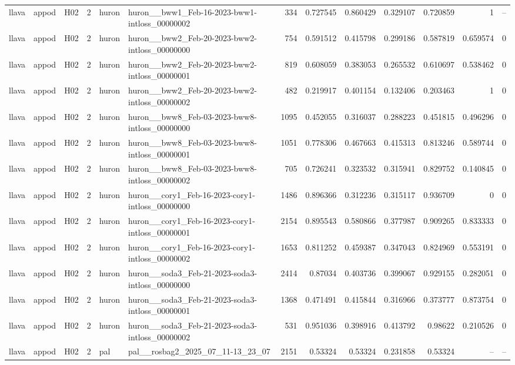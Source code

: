 \begin{longtable}{lllrllrrrrrrr}
llava & appod & H02 & 2 & huron & huron\_\_bww1\_Feb-16-2023-bww1-intloss\_00000002 & 334 & 0.727545 & 0.860429 & 0.329107 & 0.720859 & 1 & -- \\
llava & appod & H02 & 2 & huron & huron\_\_bww2\_Feb-20-2023-bww2-intloss\_00000000 & 754 & 0.591512 & 0.415798 & 0.299186 & 0.587819 & 0.659574 & 0 \\
llava & appod & H02 & 2 & huron & huron\_\_bww2\_Feb-20-2023-bww2-intloss\_00000001 & 819 & 0.608059 & 0.383053 & 0.265532 & 0.610697 & 0.538462 & 0 \\
llava & appod & H02 & 2 & huron & huron\_\_bww2\_Feb-20-2023-bww2-intloss\_00000002 & 482 & 0.219917 & 0.401154 & 0.132406 & 0.203463 & 1 & 0 \\
llava & appod & H02 & 2 & huron & huron\_\_bww8\_Feb-03-2023-bww8-intloss\_00000000 & 1095 & 0.452055 & 0.316037 & 0.288223 & 0.451815 & 0.496296 & 0 \\
llava & appod & H02 & 2 & huron & huron\_\_bww8\_Feb-03-2023-bww8-intloss\_00000001 & 1051 & 0.778306 & 0.467663 & 0.415313 & 0.813246 & 0.589744 & 0 \\
llava & appod & H02 & 2 & huron & huron\_\_bww8\_Feb-03-2023-bww8-intloss\_00000002 & 705 & 0.726241 & 0.323532 & 0.315941 & 0.829752 & 0.140845 & 0 \\
llava & appod & H02 & 2 & huron & huron\_\_cory1\_Feb-16-2023-cory1-intloss\_00000000 & 1486 & 0.896366 & 0.312236 & 0.315117 & 0.936709 & 0 & 0 \\
llava & appod & H02 & 2 & huron & huron\_\_cory1\_Feb-16-2023-cory1-intloss\_00000001 & 2154 & 0.895543 & 0.580866 & 0.377987 & 0.909265 & 0.833333 & 0 \\
llava & appod & H02 & 2 & huron & huron\_\_cory1\_Feb-16-2023-cory1-intloss\_00000002 & 1653 & 0.811252 & 0.459387 & 0.347043 & 0.824969 & 0.553191 & 0 \\
llava & appod & H02 & 2 & huron & huron\_\_soda3\_Feb-21-2023-soda3-intloss\_00000000 & 2414 & 0.87034 & 0.403736 & 0.399067 & 0.929155 & 0.282051 & 0 \\
llava & appod & H02 & 2 & huron & huron\_\_soda3\_Feb-21-2023-soda3-intloss\_00000001 & 1368 & 0.471491 & 0.415844 & 0.316966 & 0.373777 & 0.873754 & 0 \\
llava & appod & H02 & 2 & huron & huron\_\_soda3\_Feb-21-2023-soda3-intloss\_00000002 & 531 & 0.951036 & 0.398916 & 0.413792 & 0.98622 & 0.210526 & 0 \\
llava & appod & H02 & 2 & pal & pal\_\_rosbag2\_2025\_07\_11-13\_23\_07 & 2151 & 0.53324 & 0.53324 & 0.231858 & 0.53324 & -- & -- \\

\end{longtable}
